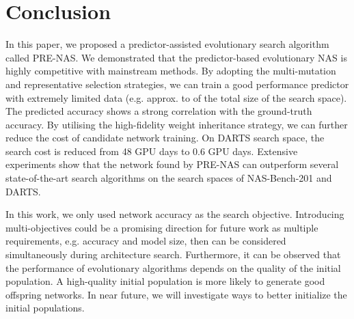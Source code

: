 \documentclass[sigconf]{acmart}
\begin{document}
\section{Conclusion}
In this paper, we proposed a predictor-assisted evolutionary search algorithm called PRE-NAS. We demonstrated that the predictor-based evolutionary NAS is highly competitive with mainstream methods. By adopting the multi-mutation and representative selection strategies, we can train a good performance predictor with extremely limited data (e.g. approx.  to  of the total size of the search space).  The predicted accuracy shows a strong correlation with the ground-truth accuracy. By utilising the high-fidelity weight inheritance strategy, we can further reduce the cost of candidate network training.  On DARTS search space, the search cost is reduced from 48 GPU days to 0.6 GPU days. Extensive experiments show that the network found by PRE-NAS can outperform several state-of-the-art search algorithms on the search spaces of NAS-Bench-201 and DARTS. 

In this work, we only used network accuracy as the search objective.  Introducing multi-objectives could be a promising direction for future work as multiple requirements, e.g. accuracy and model size, then can be considered simultaneously during architecture search.  Furthermore, it can be observed that the performance of evolutionary algorithms depends on the quality of the initial population.  A high-quality initial population is more likely to generate good offspring networks.  In near future, we will investigate ways to better initialize the initial populations. 



\end{document}
